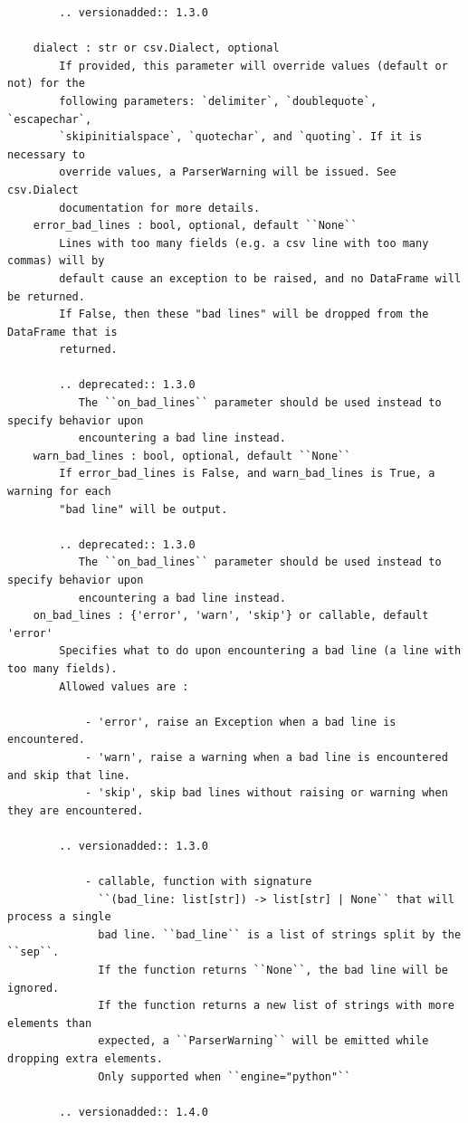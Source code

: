 \documentclass[
  letterpaper,
]{book}
\begin{document}
\begin{verbatim}
        .. versionadded:: 1.3.0

    dialect : str or csv.Dialect, optional
        If provided, this parameter will override values (default or not) for the
        following parameters: `delimiter`, `doublequote`, `escapechar`,
        `skipinitialspace`, `quotechar`, and `quoting`. If it is necessary to
        override values, a ParserWarning will be issued. See csv.Dialect
        documentation for more details.
    error_bad_lines : bool, optional, default ``None``
        Lines with too many fields (e.g. a csv line with too many commas) will by
        default cause an exception to be raised, and no DataFrame will be returned.
        If False, then these "bad lines" will be dropped from the DataFrame that is
        returned.

        .. deprecated:: 1.3.0
           The ``on_bad_lines`` parameter should be used instead to specify behavior upon
           encountering a bad line instead.
    warn_bad_lines : bool, optional, default ``None``
        If error_bad_lines is False, and warn_bad_lines is True, a warning for each
        "bad line" will be output.

        .. deprecated:: 1.3.0
           The ``on_bad_lines`` parameter should be used instead to specify behavior upon
           encountering a bad line instead.
    on_bad_lines : {'error', 'warn', 'skip'} or callable, default 'error'
        Specifies what to do upon encountering a bad line (a line with too many fields).
        Allowed values are :

            - 'error', raise an Exception when a bad line is encountered.
            - 'warn', raise a warning when a bad line is encountered and skip that line.
            - 'skip', skip bad lines without raising or warning when they are encountered.

        .. versionadded:: 1.3.0

            - callable, function with signature
              ``(bad_line: list[str]) -> list[str] | None`` that will process a single
              bad line. ``bad_line`` is a list of strings split by the ``sep``.
              If the function returns ``None``, the bad line will be ignored.
              If the function returns a new list of strings with more elements than
              expected, a ``ParserWarning`` will be emitted while dropping extra elements.
              Only supported when ``engine="python"``

        .. versionadded:: 1.4.0


\end{verbatim}
\end{document}
